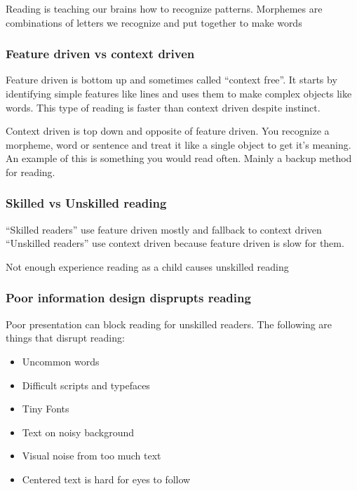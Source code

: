 \documentclass[11pt,]{article}
\providecommand{\tightlist}{%
  \setlength{\itemsep}{0pt}\setlength{\parskip}{0pt}}
\begin{document}
Reading is teaching our brains how to recognize patterns. Morphemes are
combinations of letters we recognize and put together to make words

\hypertarget{feature-driven-vs-context-driven}{%
\subsubsection{Feature driven vs context
driven}\label{feature-driven-vs-context-driven}}

Feature driven is bottom up and sometimes called ``context free''. It
starts by identifying simple features like lines and uses them to make
complex objects like words. This type of reading is faster than context
driven despite instinct.

Context driven is top down and opposite of feature driven. You recognize
a morpheme, word or sentence and treat it like a single object to get
it's meaning. An example of this is something you would read often.
Mainly a backup method for reading.

\hypertarget{skilled-vs-unskilled-reading}{%
\subsubsection{Skilled vs Unskilled
reading}\label{skilled-vs-unskilled-reading}}

``Skilled readers'' use feature driven mostly and fallback to context
driven ``Unskilled readers'' use context driven because feature driven
is slow for them.

Not enough experience reading as a child causes unskilled reading

\hypertarget{poor-information-design-disprupts-reading}{%
\subsubsection{Poor information design disprupts
reading}\label{poor-information-design-disprupts-reading}}

Poor presentation can block reading for unskilled readers. The following
are things that disrupt reading:

\begin{itemize}
\tightlist
\item
  Uncommon words
\item
  Difficult scripts and typefaces
\item
  Tiny Fonts
\item
  Text on noisy background
\item
  Visual noise from too much text
\item
  Centered text is hard for eyes to follow
\end{itemize}
\end{document}
